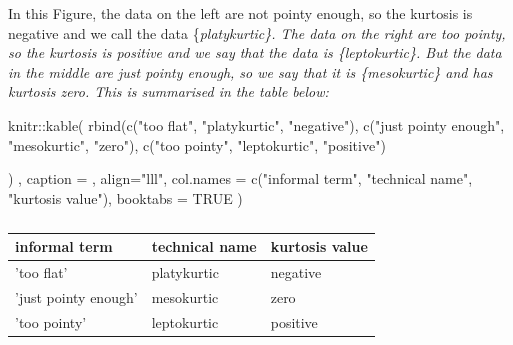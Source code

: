 \documentclass[
]{book}
\newenvironment{Shaded}{\begin{snugshade}}{\end{snugshade}}
\newcommand{\AttributeTok}[1]{\textcolor[rgb]{0.77,0.63,0.00}{#1}}
\newcommand{\ConstantTok}[1]{\textcolor[rgb]{0.00,0.00,0.00}{#1}}
\newcommand{\FunctionTok}[1]{\textcolor[rgb]{0.00,0.00,0.00}{#1}}
\newcommand{\NormalTok}[1]{#1}
\newcommand{\SpecialCharTok}[1]{\textcolor[rgb]{0.00,0.00,0.00}{#1}}
\newcommand{\StringTok}[1]{\textcolor[rgb]{0.31,0.60,0.02}{#1}}
\begin{document}
In this Figure, the data on the left are not pointy enough, so the kurtosis is negative and we call the data \{\it platykurtic\}. The data on the right are too pointy, so the kurtosis is positive and we say that the data is \{\it leptokurtic\}. But the data in the middle are just pointy enough, so we say that it is \{\it mesokurtic\} and has kurtosis zero. This is summarised in the table below:

\begin{Shaded}
\begin{Highlighting}[]
\NormalTok{knitr}\SpecialCharTok{::}\FunctionTok{kable}\NormalTok{(}
  \FunctionTok{rbind}\NormalTok{(}\FunctionTok{c}\NormalTok{(}\StringTok{"\textquotesingle{}too flat\textquotesingle{}"}\NormalTok{, }\StringTok{"platykurtic"}\NormalTok{, }\StringTok{"negative"}\NormalTok{),}
        \FunctionTok{c}\NormalTok{(}\StringTok{"\textquotesingle{}just pointy enough\textquotesingle{}"}\NormalTok{, }\StringTok{"mesokurtic"}\NormalTok{, }\StringTok{"zero"}\NormalTok{),}
        \FunctionTok{c}\NormalTok{(}\StringTok{"\textquotesingle{}too pointy\textquotesingle{}"}\NormalTok{, }\StringTok{"leptokurtic"}\NormalTok{, }\StringTok{"positive"}\NormalTok{)}
    
\NormalTok{  )}
\NormalTok{  , }\AttributeTok{caption =} \StringTok{\textquotesingle{}\textquotesingle{}}\NormalTok{, }\AttributeTok{align=}\StringTok{"lll"}\NormalTok{, }\AttributeTok{col.names =} \FunctionTok{c}\NormalTok{(}\StringTok{"informal term"}\NormalTok{, }\StringTok{"technical name"}\NormalTok{, }\StringTok{"kurtosis value"}\NormalTok{),}
  \AttributeTok{booktabs =} \ConstantTok{TRUE}
\NormalTok{)}
\end{Highlighting}
\end{Shaded}

\begin{table}

\caption{\label{tab:unnamed-chunk-1}}
\centering
\begin{tabular}[t]{lll}
\toprule
informal term & technical name & kurtosis value\\
\midrule
'too flat' & platykurtic & negative\\
'just pointy enough' & mesokurtic & zero\\
'too pointy' & leptokurtic & positive\\
\bottomrule
\end{tabular}
\end{table}

\vspace{0.5cm}
\end{document}
